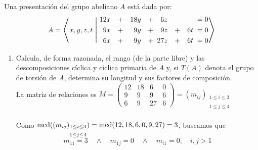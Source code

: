 \documentclass[12pt]{article}
\begin{document}
    \begin{ejercicio}[2 puntos]
        Una presentación del grupo abeliano $A$ está dada por:
        $$
            A = \scalebox{1.2}{$\Biggl\langle$}x,y,z,t \;\scalebox{1.2}{$\Biggm|$}\;
            \begin{alignedat}{7}
            12&x& \quad &+& \quad 18&y& \quad &+& \quad  6&z& \phantom{6t} &\;=\; &0\\
            9&x& &+&  9&y& &+&  9&z& \quad + \quad 6t &\;=\; &0\\
            6&x& &+&  9&y& &+& 27&z& \quad + \quad 6t &\;=\; &0
            \end{alignedat}
            \scalebox{1.2}{$\Biggr\rangle$}
        $$
        \begin{enumerate}[label=(\alph*)]
            \item Calcula, de forma razonada, el rango (de la parte libre) y las descomposiciones cíclica y cíclica primaria de $A$ y, si $T(A)$ denota el grupo de torsión de $A$, determina su longitud y sus factores de composición. \\
            
            La matriz de relaciones es 
            $M = \begin{pmatrix}
                12 & 18 & 6 & 0 \\
                9 & 9 & 9 & 6 \\
                6 & 9 & 27 & 6
            \end{pmatrix} = (m_{ij})_{\substack{1\le i\le 3 \\\\ 1\le j\le 4}}$ \\\\
            Como $\operatorname{mcd}((m_{ij})_{\substack{1\le i\le 3 \\\\ 1\le j\le 4}}) = \operatorname{mcd}(12,18,6,0,9,27) = 3 $, buscamos que $$m_{11} = 3 \quad \land \quad m_{1j} = 0 \quad \land \quad m_{i1} = 0, \quad i,j>1$$


\end{enumerate}
\end{ejercicio}
\end{document}
